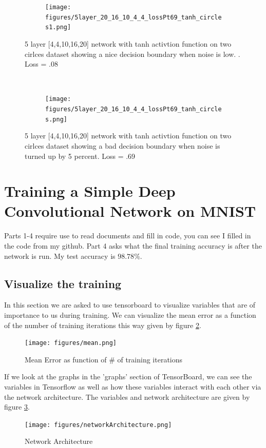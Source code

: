 \documentclass[]{article}
\begin{document}
\begin{figure}[ht]
    \centering
    \begin{subfigure}
        \centering
        \texttt{[image: figures/5layer\_20\_16\_10\_4\_4\_lossPt69\_tanh\_circles1.png]}
    \end{subfigure}%
    \caption{5 layer [4,4,10,16,20] network with tanh activtion function on two cirlces dataset showing a nice decision boundary when noise is low. . Loss = .08}
 \label{fig:hihi}
    ~ 
    \begin{subfigure}
        \centering
        \texttt{[image: figures/5layer\_20\_16\_10\_4\_4\_lossPt69\_tanh\_circles.png]}
    \end{subfigure}
    \caption{5 layer [4,4,10,16,20] network with tanh activtion function on two cirlces dataset showing a bad decision boundary when noise is turned up by 5 percent.  Loss = .69}
 \label{fig:hihi1}
\end{figure}


\section{Training a Simple Deep Convolutional Network on MNIST}
Parts 1-4 require use to read documents and fill in code, you can see I filled in the code from my github. Part 4 asks what the final training accuracy is after the network is run. My test accuracy is $98.78\%$.
\subsection{Visualize the training}
In this section we are asked to use tensorboard to visualize variables that are of importance to us during training. We can visualize the mean error as a function of the number of training iterations this way given by figure \ref{fig:MeanError}.

\begin{figure}[ht]
        \centering
        \texttt{[image: figures/mean.png]}
    \caption{Mean Error as function of \# of training iterations}
 \label{fig:MeanError}
\end{figure}

If we look at the graphs in the 'graphs' section of TensorBoard, we can see the variables in Tensorflow as well as how these variables interact with each other via the network architecture. The variables and network architecture are given by figure \ref{fig:network}.

\begin{figure}[ht]
        \centering
        \texttt{[image: figures/networkArchitecture.png]}
    \caption{Network Architecture}
 \label{fig:network}
\end{figure}
\end{document}
